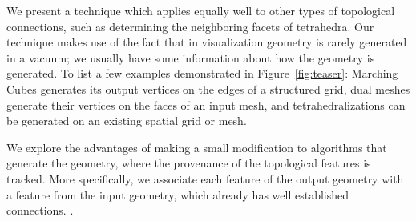 \documentclass[10pt,journal,cspaper,compsoc]{IEEEtran}
\begin{document}
We present a technique which applies equally well to other types of topological 
connections, such as determining the neighboring facets of tetrahedra. Our
technique makes use of the fact that in visualization geometry is rarely
generated in a vacuum; we usually have some information about how the
geometry is generated. To list a few examples demonstrated in Figure~\ref{fig:teaser}: Marching Cubes generates its output vertices on the edges of a structured grid, dual meshes generate their vertices on the faces of an input mesh, and tetrahedralizations can be generated on an existing spatial grid or mesh. 

We explore the advantages of making a small modification to algorithms that generate the geometry, where the provenance of the topological features is tracked. More specifically, we associate each feature of the output geometry with a feature from the input geometry, which already has well established connections. .
\end{document}
